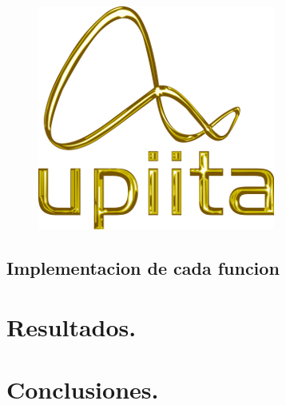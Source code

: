\documentclass[11pt]{article}
\begin{document}
\begin{figure}[H]
		\begin{center}
 			\includegraphics[width = .6\textwidth]{logo_upiita.png}
 			
		\end{center} 
\end{figure}

\subsection{Implementacion de cada funcion}
 




\section{Resultados.}



\newpage
\section{Conclusiones.}









 
\end{document}
